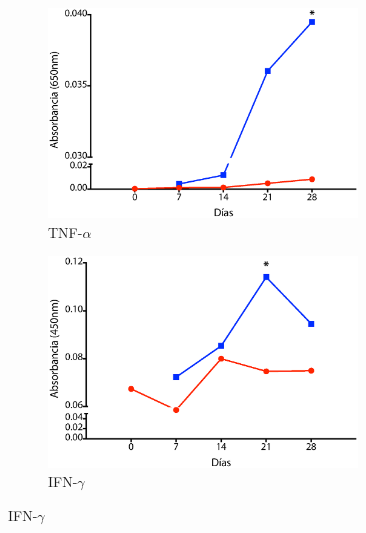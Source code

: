 \documentclass[12pt,letterpaper,oneside]{scrbook}
\begin{document}
\begin{figure}[h]
    \begin{subfigure}{0.5\textwidth}
        \includegraphics[width=0.9\textwidth]{eps/ELISA/etnfa}
        \caption{TNF-$\alpha$}
        \label{fig:elisa:tnfa}
        \end{subfigure}
    \begin{subfigure}{0.5\textwidth}
        \includegraphics[width=0.9\textwidth]{eps/ELISA/eifng}
        \caption{IFN-$\gamma$}
        \label{fig:elisa:ifng}
    \end{subfigure}
    \end{figure}
\end{document}
